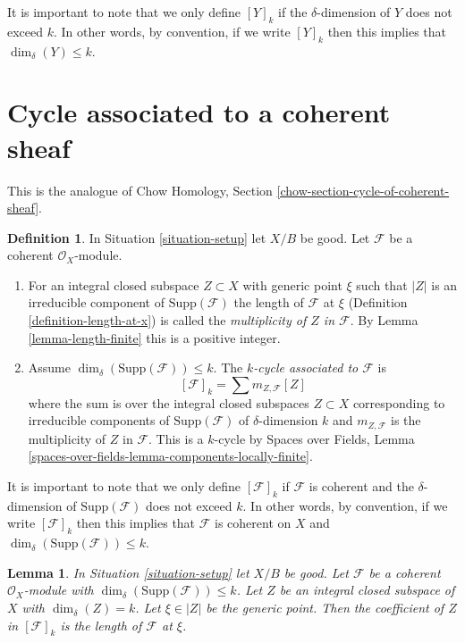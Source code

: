 \documentclass{stacks-project}
\theoremstyle{plain}
\newtheorem{lemma}[subsection]{Lemma}
\theoremstyle{definition}
\newtheorem{definition}[subsection]{Definition}
\theoremstyle{remark}
\numberwithin{equation}{subsection}
\begin{document}
\noindent
It is important to note that we only define $[Y]_k$ if the $\delta$-dimension
of $Y$ does not exceed $k$. In other words, by convention, if we write
$[Y]_k$ then this implies that $\dim_\delta(Y) \leq k$.







\section{Cycle associated to a coherent sheaf}
\label{section-cycle-of-coherent-sheaf}

\noindent
This is the analogue of
Chow Homology, Section \ref{chow-section-cycle-of-coherent-sheaf}.

\begin{definition}
\label{definition-cycle-associated-to-coherent-sheaf}
In Situation \ref{situation-setup} let $X/B$ be good.
Let $\mathcal{F}$ be a coherent $\mathcal{O}_X$-module.
\begin{enumerate}
\item For an integral closed subspace $Z \subset X$ with generic point $\xi$
such that $|Z|$ is an irreducible component of $\text{Supp}(\mathcal{F})$
the length of $\mathcal{F}$ at $\xi$ (Definition \ref{definition-length-at-x})
is called the {\it multiplicity of $Z$ in $\mathcal{F}$}.
By Lemma \ref{lemma-length-finite} this is a positive integer.
\item Assume $\dim_\delta(\text{Supp}(\mathcal{F})) \leq k$.
The {\it $k$-cycle associated to $\mathcal{F}$} is
$$
[\mathcal{F}]_k = \sum m_{Z, \mathcal{F}}[Z]
$$
where the sum is over the integral closed subspaces $Z \subset X$
corresponding to irreducible components of
$\text{Supp}(\mathcal{F})$ of $\delta$-dimension $k$
and $m_{Z, \mathcal{F}}$ is the multiplicity of $Z$ in $\mathcal{F}$.
This is a $k$-cycle by Spaces over Fields, Lemma
\ref{spaces-over-fields-lemma-components-locally-finite}.
\end{enumerate}
\end{definition}

\noindent
It is important to note that we only define $[\mathcal{F}]_k$
if $\mathcal{F}$ is coherent and the $\delta$-dimension
of $\text{Supp}(\mathcal{F})$ does not exceed $k$. In other words,
by convention, if we write $[\mathcal{F}]_k$ then this implies that
$\mathcal{F}$ is coherent on $X$ and
$\dim_\delta(\text{Supp}(\mathcal{F})) \leq k$.

\begin{lemma}
\label{lemma-reformulate-coeff-coherent}
In Situation \ref{situation-setup} let $X/B$ be good.
Let $\mathcal{F}$ be a coherent $\mathcal{O}_X$-module
with $\dim_\delta(\text{Supp}(\mathcal{F})) \leq k$.
Let $Z$ be an integral closed subspace of $X$ with $\dim_\delta(Z) = k$.
Let $\xi \in |Z|$ be the generic point.
Then the coefficient of $Z$ in $[\mathcal{F}]_k$
is the length of $\mathcal{F}$ at $\xi$.
\end{lemma}
\end{document}
